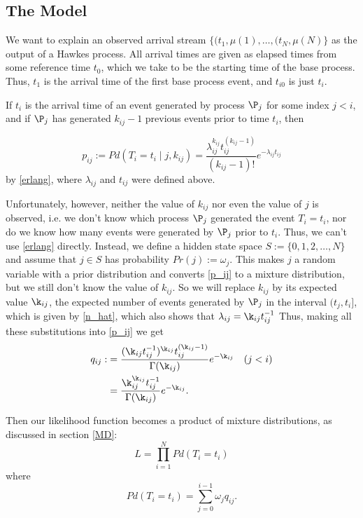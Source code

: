 \documentclass[12pt,leqno]{article}
\begin{document}
\subsection{The Model}
We want to explain an observed arrival stream $\{(t_1,\mu(1),\dots,(t_N,\mu(N)\}$ as the output
of a Hawkes process.  All arrival times are given as elapsed times from some reference time $t_0$,
which we take to be the starting time of the base process.  Thus, $t_1$ is the arrival time of the first
base process event, and $t_{i0}$ is just $t_i$.

If $t_i$ is the arrival time of an event generated by process $\P_j$ for some index $j < i$, and
if $\P_j$ has generated $k_{ij}-1$ previous events prior to time $t_i$, then 

\begin{equation}\label{p_ij}
  p_{ij} :=  Pd(T_i = t_i \mid j, k_{ij}) = \frac{\lambda_{ij}^{k_{ij}}t_{ij}^{(k_{ij}-1)}}{(k_{ij}-1)!}e^{-\lambda_{ij}t_{ij}}
\end{equation}
by \eqref{erlang}, where $\lambda_{ij}$ and $t_{ij}$ were defined above.

Unfortunately, however, neither the value of $k_{ij}$ nor even the value of $j$ is  observed, i.e. we don't know
which process $\P_j$ generated the event $T_i = t_i$, nor do we know how many events were generated by $\P_j$
prior to $t_i$.  Thus, we can't use \eqref{erlang} directly. Instead,
we define a hidden state space $S := \{0,1,2,\dots,N\}$ and assume that $j\in{S}$ has probability $Pr(j) := \omega_j$.
This makes $j$ a random variable with a prior distribution and converts \eqref{p_ij} to a mixture distribution, but
we still don't know the value of $k_{ij}$.  So we
will replace $k_{ij}$ by its expected value $\k_{ij}$, the expected number of events generated by $\P_j$
in the interval $(t_j,t_i]$, which is  given by \eqref{n_hat}, which also shows that $\lambda_{ij} = \k_{ij}t_{ij}^{-1}$
Thus, making all these substitutions into \eqref{p_ij} we get
\begin{equation}\label{q_ij}
  \begin{split}
    q_{ij} :&= \frac{(\k_{ij}t_{ij}^{-1})^{\k_{ij}}t_{ij}^{(\k_{ij}-1)}}{\Gamma(\k_{ij})}e^{-\k_{ij}}\quad (j < i)\\
    &= \frac{\k_{ij}^{\k_{ij}}t_{ij}^{-1}}{\Gamma(\k_{ij})}e^{-\k_{ij}}.
  \end{split}
\end{equation}

Then our likelihood function becomes a product of mixture distributions, as discussed in section \eqref{MD}:
$$
L = \prod_{i=1}^NPd(T_i = t_i)
$$
where 
\begin{equation}\label{likelihood}
    Pd(T_i = t_i) = \sum_{j=0}^{i-1}\omega_jq_{ij}.
\end{equation}
\end{document}

